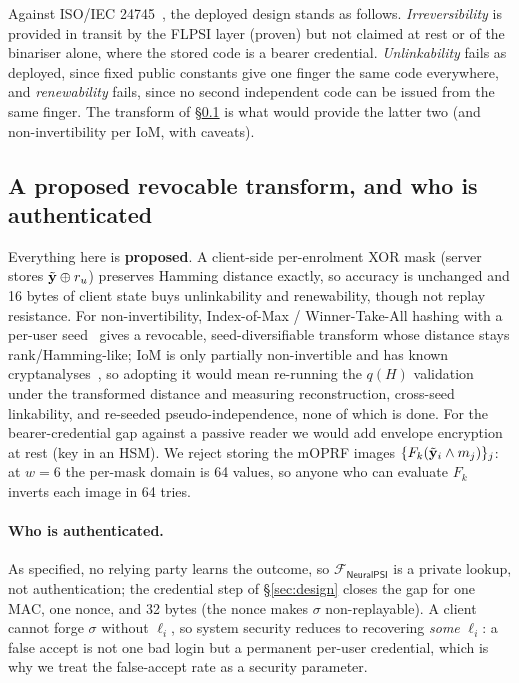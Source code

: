 Against ISO/IEC 24745~\cite{ISO24745}, the deployed design stands as follows.
\emph{Irreversibility} is provided in transit by the FLPSI layer (proven) but not claimed at rest or
of the binariser alone, where the stored code is a bearer credential. \emph{Unlinkability} fails as
deployed, since fixed public constants give one finger the same code everywhere, and
\emph{renewability} fails, since no second independent code can be issued from the same finger. The
transform of \S\ref{sec:transform} is what would provide the latter two (and non-invertibility per
IoM, with caveats).

\subsection{A proposed revocable transform, and who is authenticated}
\label{sec:transform}

Everything here is \textbf{proposed}. A client-side per-enrolment XOR mask (server stores $\tilde{\mathbf{y}} \oplus
r_u$) preserves Hamming distance exactly, so accuracy is unchanged and 16 bytes of client state buys
unlinkability and renewability, though not replay resistance. For non-invertibility, Index-of-Max /
Winner-Take-All hashing with a per-user seed~\cite{JinEtAl18} gives a revocable, seed-diversifiable
transform whose distance stays rank/Hamming-like; IoM is only partially non-invertible and has known
cryptanalyses~\cite{GhammamEtAl20}, so adopting it would mean re-running the $q(H)$ validation under
the transformed distance and measuring reconstruction, cross-seed linkability, and re-seeded
pseudo-independence, none of which is done. For the bearer-credential gap against a passive reader we
would add envelope encryption at rest (key in an HSM). We reject storing the mOPRF images
$\{F_k(\tilde{\mathbf{y}}_i \wedge m_j)\}_j$: at $w=6$ the per-mask domain is 64 values, so anyone who can evaluate
$F_k$ inverts each image in 64 tries.

\paragraph{Who is authenticated.}\label{sec:whoauth} As specified, no relying party learns the outcome,
so $\mathcal{F}_{\mathsf{NeuralPSI}}$ is a private lookup, not authentication; the credential step of
\S\ref{sec:design} closes the gap for one MAC, one nonce, and 32 bytes (the nonce makes $\sigma$
non-replayable). A client cannot forge $\sigma$ without $\ell_i$, so system security reduces to
recovering \emph{some} $\ell_i$: a false accept is not one bad login but a permanent per-user
credential, which is why we treat the false-accept rate as a security parameter.


